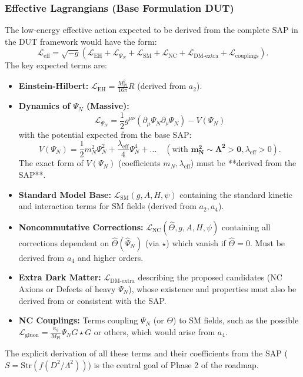 \documentclass[11pt, a4paper]{article}
\theoremstyle{remark}
\newcommand{\Op}[1]{\hat{#1}}
\newcommand{\Str}{\mathrm{Str}}
\newcommand{\Mpl}{M_{\mathrm{Pl}}}
\begin{document}
\subsubsection{Effective Lagrangians (Base Formulation DUT)}
\label{ssubsec:full_lagrangians_final_revised}
The low-energy effective action expected to be derived from the complete SAP in the DUT framework would have the form:
\[ \mathcal{L}_{\text{eff}} = \sqrt{-g} \left( \mathcal{L}_{\text{EH}} + \mathcal{L}_{\Psi_N} + \mathcal{L}_{\text{SM}} + \mathcal{L}_{\text{NC}} + \mathcal{L}_{\text{DM-extra}} + \mathcal{L}_{\text{couplings}} \right). \]
The key expected terms are:
\begin{itemize}
    \item \textbf{Einstein-Hilbert:} \( \mathcal{L}_{\text{EH}} = \frac{\Mpl^2}{16\pi} R \) (derived from \(a_2\)).
    \item \textbf{Dynamics of \( \Psi_N \) (Massive):}
          \begin{equation} \label{eq:L_PsiN_explicit_final_redux}
          \mathcal{L}_{\Psi_N} = \frac{1}{2} g^{\mu\nu} (\partial_\mu \Psi_N \partial_\nu \Psi_N) - V(\Psi_N)
          \end{equation}
          with the potential expected from the base SAP:
          \begin{equation}\label{eq:potencial_psi_n_final_redux}
          V(\Psi_N) = \frac{1}{2} m_N^2 \Psi_N^2 + \frac{\lambda_{\text{eff}}}{4} \Psi_N^4 + \dots \quad (\text{with } \mathbf{m_N^2 \sim \Lambda^2 > 0} , \lambda_{\text{eff}} > 0).
          \end{equation}
          The exact form of \( V(\Psi_N) \) (coefficients \( m_N, \lambda_{\text{eff}} \)) must be **derived from the SAP**.
    \item \textbf{Standard Model Base:} \( \mathcal{L}_{\text{SM}}(g, A, H, \psi) \) containing the standard kinetic and interaction terms for SM fields (derived from \(a_2, a_4\)).
    \item \textbf{Noncommutative Corrections:} \( \mathcal{L}_{\text{NC}}(\Op{\Theta}, g, A, H, \psi) \) containing all corrections dependent on \( \Op{\Theta}(\Op{\Psi}_N) \) (via \( \star \)) which vanish if \( \Op{\Theta} = 0 \). Must be derived from \(a_4\) and higher orders.
    \item \textbf{Extra Dark Matter:} \( \mathcal{L}_{\text{DM-extra}} \) describing the proposed candidates (NC Axions or Defects of heavy \( \Psi_N \)), whose existence and properties must also be derived from or consistent with the SAP.
    \item \textbf{NC Couplings:} Terms coupling \( \Psi_N \) (or \( \Theta \)) to SM fields, such as the possible \( \mathcal{L}_{\text{gluon}} = \frac{\kappa_g}{\Mpl} \Psi_N G \star G \) or others, which would arise from \( a_4 \).
\end{itemize}
The explicit derivation of all these terms and their coefficients from the SAP (\( S = \Str(f(D^2/\Lambda^2)) \)) is the central goal of Phase 2 of the roadmap.
\end{document}
